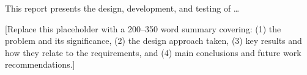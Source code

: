 \begin{Abstract}{}

This report presents the design, development, and testing of \ldots{}

[Replace this placeholder with a 200–350 word summary covering:
(1) the problem and its significance,
(2) the design approach taken,
(3) key results and how they relate to the requirements, and
(4) main conclusions and future work recommendations.]


\end{Abstract}
